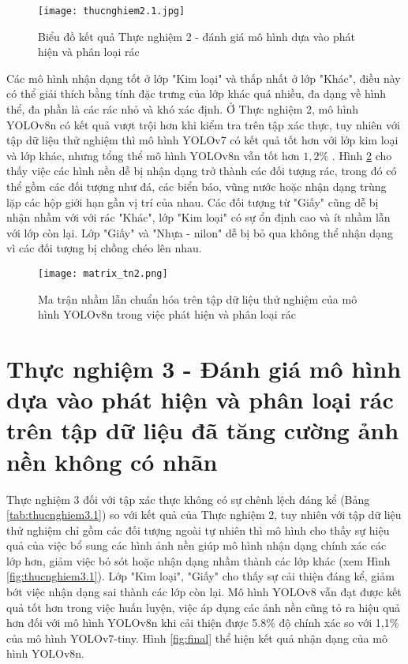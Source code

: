 \documentclass[../the.tex]{subfiles}
\begin{document}
\begin{figure}[H]
    \centering
    \texttt{[image: thucnghiem2.1.jpg]}
    \caption{Biểu đồ kết quả Thực nghiệm 2 - đánh giá mô hình dựa vào phát hiện và phân loại rác}
    \label{fig:thucnghiem2}
\end{figure}

{\fontsize{13}{12} \selectfont

    Các mô hình nhận dạng tốt ở lớp "Kim loại" và thấp nhất ở lớp "Khác",
    điều này có thể giải thích bằng tính đặc trưng của lớp khác quá nhiều, đa dạng về hình thể, đa phần là các rác nhỏ và khó xác định.
    Ở Thực nghiệm 2, mô hình YOLOv8n có kết quả vượt trội hơn khi kiểm tra trên tập xác thực, tuy nhiên với tập dữ liệu thử nghiệm thì mô hình YOLOv7 có kết quả tốt hơn với lớp kim loại và lớp khác, nhưng tổng thể mô hình YOLOv8n vẫn tốt hơn $1,2\%$ .
    Hình \ref{fig:thucnghiem2.1} cho thấy việc các hình nền dễ bị nhận dạng trở thành các đối tượng rác, trong đó có thể gồm các đối tượng như đá, các biển báo, vũng nước hoặc nhận dạng trùng lặp các hộp giới hạn gần vị trí của nhau.
    Các đối tượng từ "Giấy" cũng dễ bị nhận nhầm với với rác "Khác", lớp "Kim loại" có sự ổn định cao và ít nhầm lẫn với lớp còn lại. Lớp "Giấy" và "Nhựa - nilon" dễ bị bỏ qua không thể nhận dạng vì các đối tượng bị chồng chéo lên nhau.

}


\begin{figure}[H]
    \centering
    \texttt{[image: matrix\_tn2.png]}
    \caption{Ma trận nhầm lẫn chuẩn hóa trên tập dữ liệu thử nghiệm của mô hình YOLOv8n trong việc phát hiện và phân loại rác}
    \label{fig:thucnghiem2.1}
\end{figure}

\section{Thực nghiệm 3 - Đánh giá mô hình dựa vào phát hiện và phân loại rác trên tập dữ liệu đã tăng cường ảnh nền không có nhãn} 
{\fontsize{13}{12} \selectfont

Thực nghiệm 3 đối với tập xác thực không có sự chênh lệch đáng kể (Bảng \ref{tab:thucnghiem3.1}) so với kết quả của Thực nghiệm 2, tuy nhiên với tập dữ liệu thử nghiệm chỉ gồm các đối tượng ngoài tự nhiên thì mô hình
cho thấy sự hiệu quả của việc bổ sung các hình ảnh nền giúp mô hình nhận dạng chính xác các lớp hơn, giảm việc bỏ sót hoặc nhận dạng nhầm thành các lớp khác (xem Hình \ref{fig:thucnghiem3.1}). 
Lớp "Kim loại", "Giấy" cho thấy sự cải thiện đáng kể, giảm bớt việc nhận dạng sai thành các lớp còn lại.
Mô hình YOLOv8 vẫn đạt được kết quả tốt hơn trong việc huấn luyện, việc áp dụng các ảnh nền cũng tỏ ra hiệu quả hơn đối với mô hình YOLOv8n khi cải thiện được 5.8\% độ chính xác so với 1,1\% của mô hình YOLOv7-tiny.
Hình \ref{fig:final} thể hiện kết quả nhận dạng của mô hình YOLOv8n.

}
\end{document}
